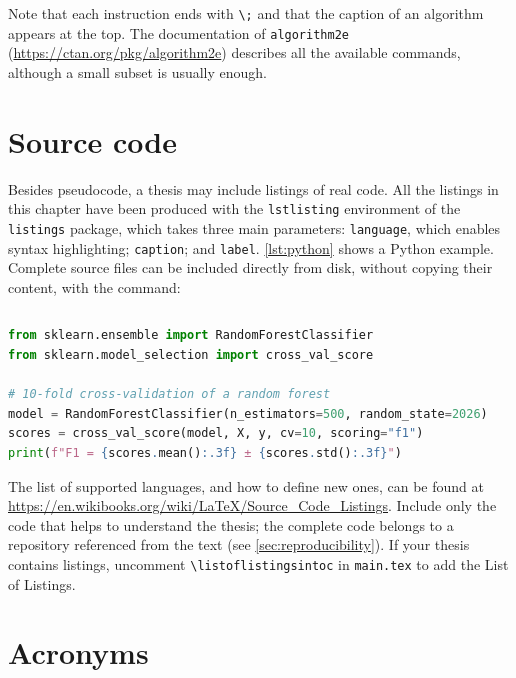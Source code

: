Note that each instruction ends with \verb|\;| and that the caption of an algorithm appears
at the top. The documentation of \texttt{algorithm2e}
(\url{https://ctan.org/pkg/algorithm2e}) describes all the available commands, although a
small subset is usually enough.

\section{Source code}\label{sec:code}

Besides pseudocode, a thesis may include listings of real code. All the listings in this
chapter have been produced with the \texttt{lstlisting} environment of the
\texttt{listings} package, which takes three main parameters: \texttt{language}, which
enables syntax highlighting; \texttt{caption}; and \texttt{label}. \autoref{lst:python}
shows a Python example. Complete source files can be included directly from disk, without
copying their content, with the \verb|| command:

\begin{lstlisting}[language={[LaTeX]TeX}, numbers=none]

\end{lstlisting}

\begin{lstlisting}[language=Python, caption={Training a classifier with scikit-learn.}, label=lst:python]
from sklearn.ensemble import RandomForestClassifier
from sklearn.model_selection import cross_val_score

# 10-fold cross-validation of a random forest
model = RandomForestClassifier(n_estimators=500, random_state=2026)
scores = cross_val_score(model, X, y, cv=10, scoring="f1")
print(f"F1 = {scores.mean():.3f} ± {scores.std():.3f}")
\end{lstlisting}

The list of supported languages, and how to define new ones, can be found at
\url{https://en.wikibooks.org/wiki/LaTeX/Source_Code_Listings}. Include only the code that
helps to understand the thesis; the complete code belongs to a repository referenced from
the text (see \autoref{sec:reproducibility}). If your thesis contains listings, uncomment
\verb|\listoflistingsintoc| in \texttt{main.tex} to add the List of Listings.

\section{Acronyms}\label{sec:acronyms}

